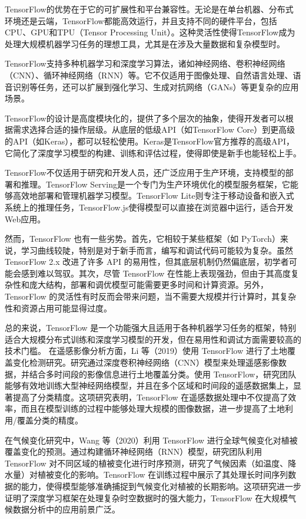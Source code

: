 \documentclass[AutoFakeBold]{LZUThesis-PgD&PhD}
\begin{document}
	TensorFlow的优势在于它的可扩展性和平台兼容性。无论是在单台机器、分布式环境还是云端，TensorFlow都能高效运行，并且支持不同的硬件平台，包括CPU、GPU和TPU（Tensor Processing Unit）。这种灵活性使得TensorFlow成为处理大规模机器学习任务的理想工具，尤其是在涉及大量数据和复杂模型时。
	
	TensorFlow支持多种机器学习和深度学习算法，诸如神经网络、卷积神经网络（CNN）、循环神经网络（RNN）等。它不仅适用于图像处理、自然语言处理、语音识别等任务，还可以扩展到强化学习、生成对抗网络（GANs）等更复杂的应用场景。
	
	TensorFlow的设计是高度模块化的，提供了多个层次的抽象，使得开发者可以根据需求选择合适的操作层级。从底层的低级API（如TensorFlow Core）到更高级的API（如Keras），都可以轻松使用。Keras是TensorFlow官方推荐的高级API，它简化了深度学习模型的构建、训练和评估过程，使得即使是新手也能轻松上手。
	
	TensorFlow不仅适用于研究和开发人员，还广泛应用于生产环境，支持模型的部署和推理。TensorFlow Serving是一个专门为生产环境优化的模型服务框架，它能够高效地部署和管理机器学习模型。TensorFlow Lite则专注于移动设备和嵌入式系统上的推理任务，TensorFlow.js使得模型可以直接在浏览器中运行，适合开发Web应用。
	
	
	然而，TensorFlow 也有一些劣势。首先，它相较于某些框架（如 PyTorch）来说，学习曲线较陡，特别是对于新手而言，编写和调试代码可能较为复杂。虽然 TensorFlow 2.x 改进了许多 API 的易用性，但其底层机制仍然偏底层，初学者可能会感到难以驾驭。其次，尽管 TensorFlow 在性能上表现强劲，但由于其高度复杂性和庞大结构，部署和调优模型可能需要更多时间和计算资源。另外，TensorFlow 的灵活性有时反而会带来问题，当不需要大规模并行计算时，其复杂性和资源占用可能显得过度。
	
	总的来说，TensorFlow 是一个功能强大且适用于各种机器学习任务的框架，特别适合大规模分布式训练和深度学习模型的开发，但在易用性和调试方面需要较高的技术门槛。
	在遥感影像分析方面，Li 等（2019）使用 TensorFlow 进行了土地覆盖变化检测研究\cite{li2019}。研究通过深度卷积神经网络（CNN）模型来处理遥感影像数据，并结合多时间段的影像信息进行土地覆盖分类。使用 TensorFlow，研究团队能够有效地训练大型神经网络模型，并且在多个区域和时间段的遥感数据集上，显著提高了分类精度。这项研究表明，TensorFlow 在遥感数据处理中不仅提高了效率，而且在模型训练的过程中能够处理大规模的图像数据，进一步提高了土地利用/覆盖分类的精度。
	
	在气候变化研究中，Wang 等（2020）利用 TensorFlow 进行全球气候变化对植被覆盖变化的预测\cite{wang2020H}。通过构建循环神经网络（RNN）模型，研究团队利用 TensorFlow 对不同区域的植被变化进行时序预测，研究了气候因素（如温度、降水量）对植被变化的影响。TensorFlow 在训练过程中展示了其处理长时间序列数据的能力，使得模型能够准确捕捉到气候变化对植被的长期影响。这项研究进一步证明了深度学习框架在处理复杂时空数据时的强大能力，TensorFlow 在大规模气候数据分析中的应用前景广泛。
	
\end{document}
